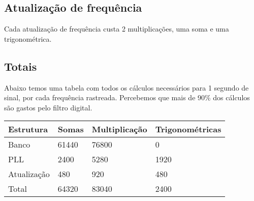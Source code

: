 \subsection{Atualização de frequência}

\indent Cada atualização de frequência custa 2 multiplicações, uma soma e uma trigonométrica.

\subsection{Totais}

Abaixo temos uma tabela com todos os cálculos necessários para 1 segundo de sinal, por cada frequência rastreada. Percebemos que mais de 90\% dos cálculos são gastos pelo filtro digital.

\begin{table}[H]
	\centering
	\begin{tabular}{l|l|l|l}
		Estrutura   & Somas & Multiplicação & Trigonométricas \\
		\hline 
		Banco       & 61440 & 76800         & 0               \\
		PLL         & 2400  & 5280          & 1920            \\
		Atualização & 480   & 920           & 480             \\
		\hline
		Total       & 64320 & 83040         & 2400           
	\end{tabular}
\end{table}
